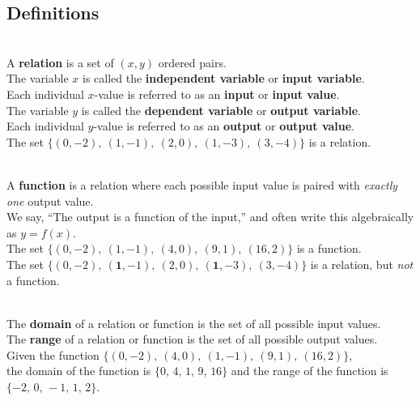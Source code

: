 \newpage

\subsection*{Definitions} \label{def-functions-and-notation}

\begin{myDefinition}[{Relation:}]~\\[0.5mm]
A {\bf relation} is a set of $(x,y)$ ordered pairs.  \\[0.5em]
The variable $x$ is called the {\bf independent variable} or {\bf input variable}.  \\
Each individual $x$-value is referred to as an {\bf input} or {\bf input value}.\\[0.5em]
The variable $y$ is called the {\bf dependent variable} or {\bf output variable}.  \\
Each individual $y$-value is referred to as an {\bf output} or {\bf output value}. \\[0.5em]
 The set $\{ (0,-2), ~ (1, -1), ~ (2, 0), ~ (1, -3),~ (3,-4) \}$ is a relation.

\end{myDefinition}

\begin{myDefinition}[Function:]~\\[0.5mm]
A {\bf function} is a relation where each possible input value is paired with {\it exactly one} output value.\\
We say, ``The output is a function of the input,'' and often write this algebraically as $y = f(x)$. \\[0.5em]
 The set $\{ (0,-2), ~ (1, -1), ~ (4, 0), ~ (9,1),~ (16,2) \}$ is a function.\\
 The set $\{ (0,-2), ~ (\boldsymbol{1}, -1), ~ (2, 0), ~ (\boldsymbol{1}, -3),~ (3,-4) \}$ is a relation, but {\it not} a function.

\end{myDefinition}

\begin{myDefinition}~\\[0.5mm]
The {\bf domain} of a relation or function is the set of all possible input values.\\
The {\bf range} of a relation or function is the set of all possible output values.\\[0.5em]
 Given the function $\{ (0,-2), ~ (4, 0), ~ (1, -1), ~ (9,1),~ (16,2) \}$,\\
the domain of the function is $\{ 0,\,4,\,1,\,9,\,16\}$ and the range of the function is $\{ -2,\,0,\,-1,\,1,\,2\}$.

\end{myDefinition}



